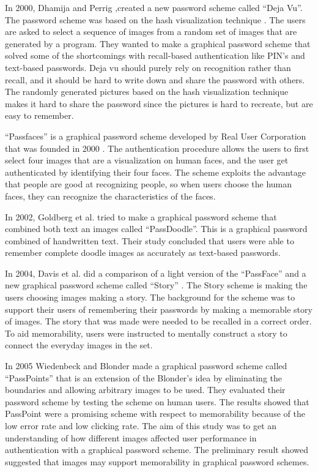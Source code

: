   In 2000, Dhamija and Perrig \cite{DejaVu},created a new password scheme called ``Deja Vu''. The password scheme was based on the hash visualization technique \cite{HashVisualization}. The users are asked to select a sequence of images from a random set of images that are generated by a program. They wanted to make a graphical password scheme that solved some of the shortcomings with recall-based authentication like PIN's and text-based passwords. Deja vu should purely rely on recognition rather than recall, and it should be hard to write down and share the password with others. The randomly generated pictures based on the hash visualization technique makes it hard to share the password since the pictures is hard to recreate, but are easy to remember. 

  ``Passfaces'' is a graphical password scheme developed by Real User Corporation that was founded in 2000 \cite{passface}. The authentication procedure allows the users to first select four images that are a visualization on human faces, and the user get authenticated by identifying their four faces. The scheme exploits the advantage that people are good at recognizing people, so when users choose the human faces, they can recognize the characteristics of the faces.

  In 2002, Goldberg et al. \cite{PassDoodle} tried to make a graphical password scheme that combined both text an images called ``PassDoodle''. This is a graphical password combined of handwritten text. Their study concluded that users were able to remember complete doodle images as accurately as text-based passwords.

  In 2004, Davis et al. did a comparison of a light version of the ``PassFace'' and a new graphical password scheme called ``Story'' \cite{Davis}. The Story scheme is making the users choosing images making a story. The background for the scheme was to support their users of remembering their passwords by making a memorable story of images. The story that was made were needed to be recalled in a correct order. To aid memorability, users were instructed to mentally construct a story to connect the everyday images in the set. 

  In 2005 Wiedenbeck and Blonder made a graphical password scheme called ``PassPoints'' \cite{PassPoints} that is an  extension of the Blonder's \cite{Blonder} idea by eliminating the boundaries and allowing arbitrary images to be used. They evaluated their password scheme by testing the scheme on human users. The results showed that PassPoint were a promising scheme with respect to memorability because of the low error rate and low clicking rate. 
  The aim of this study was to get an understanding of how different images affected user performance in authentication with a graphical password scheme. The preliminary result showed suggested that images may support memorability in graphical password schemes. 

